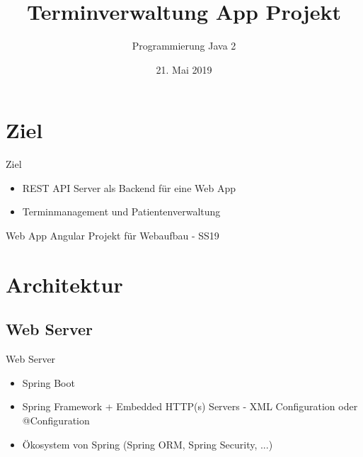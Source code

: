 \documentclass{beamer}
\title{Terminverwaltung App Projekt}
\author{Programmierung Java 2}
\date{21. Mai 2019}
\begin{document}
\begin{frame}
  \titlepage
\end{frame}


\section{Ziel}

\begin{frame}{Ziel}

\begin{itemize}
  \item REST API Server als Backend für eine Web App
  \item Terminmanagement und Patientenverwaltung 
\end{itemize}

\vskip 1cm

\begin{block}{Web App}
Angular Projekt für Webaufbau - SS19
\end{block}

\end{frame}

\section{Architektur}

\subsection{Web Server}

\begin{frame}{Web Server}

\begin{itemize}
\item Spring Boot
\item Spring Framework + Embedded HTTP(s) Servers - XML Configuration oder @Configuration
\item Ökosystem von Spring (Spring ORM, Spring Security, ...)
\end{itemize}

\end{frame}
\end{document}
